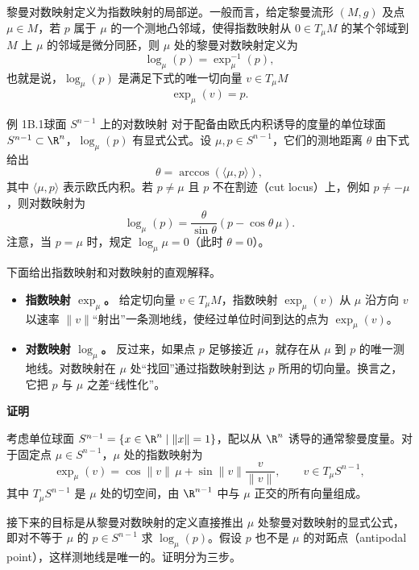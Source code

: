 黎曼对数映射定义为指数映射的局部逆。一般而言，给定黎曼流形 $(M,g)$ 及点 $\mu\in M$，若 $p$ 属于 $\mu$ 的一个测地凸邻域，使得指数映射从 $0\in T_\mu M$ 的某个邻域到 $M$ 上 $\mu$ 的邻域是微分同胚，则 $\mu$ 处的黎曼对数映射定义为
\[
  \log_\mu(p)=\exp_\mu^{-1}(p),
\]
也就是说，$\log_\mu(p)$ 是满足下式的唯一切向量 $v\in T_\mu M$
\[
  \exp_\mu(v)=p.
\]

\begin{statement}{例 1B.1}{球面 $S^{n-1}$ 上的对数映射}
对于配备由欧氏内积诱导的度量的单位球面 $S^{n-1}\subset\R^n$，$\log_\mu(p)$ 有显式公式。设 $\mu,p\in S^{n-1}$，它们的测地距离 $\theta$ 由下式给出
\[
  \theta=\arccos(\langle\mu,p\rangle),
\]
其中 $\langle\mu,p\rangle$ 表示欧氏内积。若 $p\ne\mu$ 且 $p$ 不在割迹（cut locus）上，例如 $p\ne-\mu$，则对数映射为
\[
  \log_\mu(p)=\frac{\theta}{\sin\theta}(p-\cos\theta\,\mu).
\]
注意，当 $p=\mu$ 时，规定 $\log_\mu\mu=0$（此时 $\theta=0$）。
\end{statement}

下面给出指数映射和对数映射的直观解释。
\begin{itemize}
\item \textbf{指数映射 $\exp_\mu$。} 给定切向量 $v\in T_\mu M$，指数映射 $\exp_\mu(v)$ 从 $\mu$ 沿方向 $v$ 以速率 $\lVert v\rVert$“射出”一条测地线，使经过单位时间到达的点为 $\exp_\mu(v)$。
\item \textbf{对数映射 $\log_\mu$。} 反过来，如果点 $p$ 足够接近 $\mu$，就存在从 $\mu$ 到 $p$ 的唯一测地线。对数映射在 $\mu$ 处“找回”通过指数映射到达 $p$ 所用的切向量。换言之，它把 $p$ 与 $\mu$ 之差“线性化”。
\end{itemize}

\noindent\textbf{证明}\par
考虑单位球面 $S^{n-1}=\{x\in\R^n\mid\lVert x\rVert=1\}$，配以从 $\R^n$ 诱导的通常黎曼度量。对于固定点 $\mu\in S^{n-1}$，$\mu$ 处的指数映射为
\begin{equation*}
  \exp_\mu(v)=\cos\lVert v\rVert\,\mu+\sin\lVert v\rVert\frac{v}{\lVert v\rVert},
    \qquad v\in T_\mu S^{n-1},
  \tag{6B1}\label{eq:6B1}
\end{equation*}
其中 $T_\mu S^{n-1}$ 是 $\mu$ 处的切空间，由 $\R^{n-1}$ 中与 $\mu$ 正交的所有向量组成。%

接下来的目标是从黎曼对数映射的定义直接推出 $\mu$ 处黎曼对数映射的显式公式，即对不等于 $\mu$ 的 $p\in S^{n-1}$ 求 $\log_\mu(p)$。假设 $p$ 也不是 $\mu$ 的对跖点（antipodal point），这样测地线是唯一的。证明分为三步。

